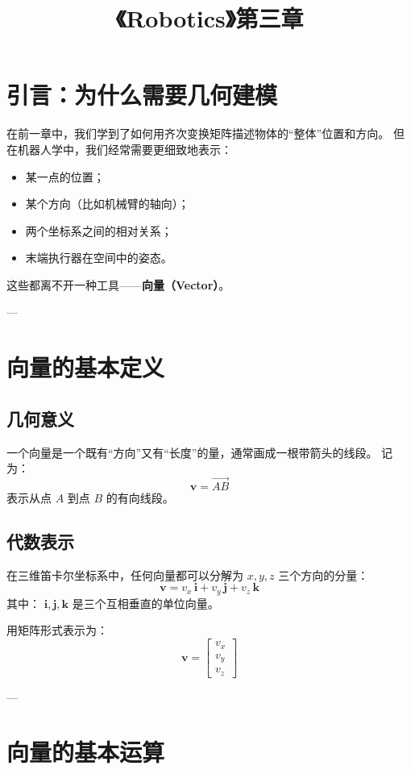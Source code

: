 \documentclass[12pt,a4paper]{article}
\title{《Robotics》第三章}
\author{}
\date{}
\begin{document}
\maketitle

\section{引言：为什么需要几何建模}
在前一章中，我们学到了如何用齐次变换矩阵描述物体的“整体”位置和方向。  
但在机器人学中，我们经常需要更细致地表示：
\begin{itemize}
  \item 某一点的位置；
  \item 某个方向（比如机械臂的轴向）；
  \item 两个坐标系之间的相对关系；
  \item 末端执行器在空间中的姿态。
\end{itemize}

这些都离不开一种工具——\textbf{向量（Vector）}。

---

\section{向量的基本定义}
\subsection{几何意义}
一个向量是一个既有“方向”又有“长度”的量，通常画成一根带箭头的线段。  
记为：
\[
\boldsymbol{v} = \overrightarrow{AB}
\]
表示从点 \(A\) 到点 \(B\) 的有向线段。

\subsection{代数表示}
在三维笛卡尔坐标系中，任何向量都可以分解为 $x,y,z$ 三个方向的分量：
\[
\boldsymbol{v} = v_x\,\boldsymbol{i} + v_y\,\boldsymbol{j} + v_z\,\boldsymbol{k}
\]
其中：
\(\boldsymbol{i}, \boldsymbol{j}, \boldsymbol{k}\) 是三个互相垂直的单位向量。

用矩阵形式表示为：
\[
\boldsymbol{v} = 
\begin{bmatrix}
v_x \\ v_y \\ v_z
\end{bmatrix}
\]

---

\section{向量的基本运算}
\end{document}
